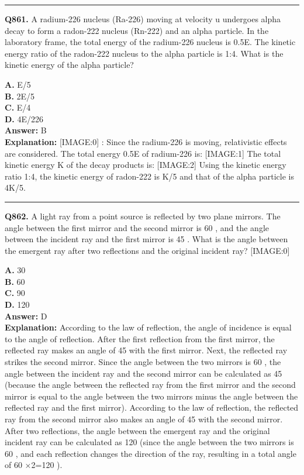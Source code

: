 \documentclass[12pt]{article}
\begin{document}
\hrule
\vspace{1em}


\noindent
\textbf{Q861.} A radium-226 nucleus (Ra-226) moving at velocity u undergoes alpha decay to form a radon-222 nucleus (Rn-222) and an alpha particle. In the laboratory frame, the total energy of the radium-226 nucleus is 0.5E. The kinetic energy ratio of the radon-222 nucleus to the alpha particle is 1:4. What is the kinetic energy of the alpha particle?



\textbf{A.} E​/5 \\
\textbf{B.} 2E​/5 \\
\textbf{C.} E​/4 \\
\textbf{D.} 4E​/226 \\

\textbf{Answer:} B \\
\textbf{Explanation:} [IMAGE:0]
:
Since the radium-226 is moving, relativistic effects are considered. The total energy 0.5E of radium-226 is:
[IMAGE:1]
The total kinetic energy K of the decay products is:
[IMAGE:2]
Using the kinetic energy ratio 1:4, the kinetic energy of radon-222 is K​/5 and that of the alpha particle is 4K​/5.

\hrule
\vspace{1em}


\noindent
\textbf{Q862.} A light ray from a point source is reflected by two plane mirrors. The angle between the first mirror and the second mirror is 60
\circ 
, and the angle between the incident ray and the first mirror is
45
\circ 
. What is the angle between the emergent ray after two reflections and the original incident ray?
[IMAGE:0]



\textbf{A.} 30
\circ  \\
\textbf{B.} 60
\circ  \\
\textbf{C.} 90
\circ  \\
\textbf{D.} 120
\circ  \\

\textbf{Answer:} D \\
\textbf{Explanation:} According to the law of reflection, the angle of incidence is equal to the angle of reflection. After the first reflection from the first mirror, the reflected ray makes an angle of
45
\circ 
with the first mirror.
Next, the reflected ray strikes the second mirror. Since the angle between the two mirrors is 60
\circ 
, the angle between the incident ray and the second mirror can be calculated as
45
\circ 
(because the angle between the reflected ray from the first mirror and the second mirror is equal to the angle between the two mirrors minus the angle between the reflected ray and the first mirror).
According to the law of reflection, the reflected ray from the second mirror also makes an angle of
45
\circ 
with the second mirror. After two reflections, the angle between the emergent ray and the original incident ray can be calculated as 120
\circ 
(since the angle between the two mirrors is 60
\circ 
, and each reflection changes the direction of the ray, resulting in a total angle of 60
\circ 
×2=120
\circ 
).
\end{document}
